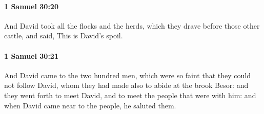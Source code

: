		\paragraph{1 Samuel 30:20} %
			\label{1SAMUEL-30-20}

			And David took all the flocks and the herds, which they drave before those other cattle, and said, This is David’s spoil.


		\paragraph{1 Samuel 30:21} %
			\label{1SAMUEL-30-21}

			And David came to the two hundred men, which were so faint that they could not follow David, whom they had made also to abide at the brook Besor: and they went forth to meet David, and to meet the people that were with him: and when David came near to the people, he saluted them.

